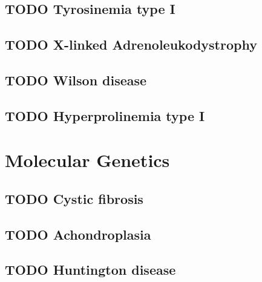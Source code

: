 \documentclass{scrartcl}
\begin{document}
\subsection{{\bfseries\sffamily TODO} Tyrosinemia type I}
\label{sec:orgc68c467}
\subsection{{\bfseries\sffamily TODO} X-linked Adrenoleukodystrophy}
\label{sec:org01ac644}
\subsection{{\bfseries\sffamily TODO} Wilson disease}
\label{sec:org3788c7d}
\subsection{{\bfseries\sffamily TODO} Hyperprolinemia type I}
\label{sec:org0ea8299}

\section{Molecular Genetics}
\label{sec:org54fc746}
\subsection{{\bfseries\sffamily TODO} Cystic fibrosis}
\label{sec:orgf7ed1bc}
\subsection{{\bfseries\sffamily TODO} Achondroplasia}
\label{sec:orgb0d608c}
\subsection{{\bfseries\sffamily TODO} Huntington disease}
\label{sec:org0f0cf75}
\end{document}
